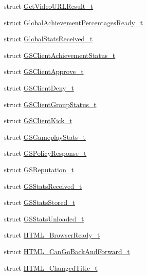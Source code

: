 \begin{DoxyCompactItemize}
\item 
struct \hyperlink{structValve_1_1Steamworks_1_1GetVideoURLResult__t}{Get\+Video\+U\+R\+L\+Result\+\_\+t}
\item 
struct \hyperlink{structValve_1_1Steamworks_1_1GlobalAchievementPercentagesReady__t}{Global\+Achievement\+Percentages\+Ready\+\_\+t}
\item 
struct \hyperlink{structValve_1_1Steamworks_1_1GlobalStatsReceived__t}{Global\+Stats\+Received\+\_\+t}
\item 
struct \hyperlink{structValve_1_1Steamworks_1_1GSClientAchievementStatus__t}{G\+S\+Client\+Achievement\+Status\+\_\+t}
\item 
struct \hyperlink{structValve_1_1Steamworks_1_1GSClientApprove__t}{G\+S\+Client\+Approve\+\_\+t}
\item 
struct \hyperlink{structValve_1_1Steamworks_1_1GSClientDeny__t}{G\+S\+Client\+Deny\+\_\+t}
\item 
struct \hyperlink{structValve_1_1Steamworks_1_1GSClientGroupStatus__t}{G\+S\+Client\+Group\+Status\+\_\+t}
\item 
struct \hyperlink{structValve_1_1Steamworks_1_1GSClientKick__t}{G\+S\+Client\+Kick\+\_\+t}
\item 
struct \hyperlink{structValve_1_1Steamworks_1_1GSGameplayStats__t}{G\+S\+Gameplay\+Stats\+\_\+t}
\item 
struct \hyperlink{structValve_1_1Steamworks_1_1GSPolicyResponse__t}{G\+S\+Policy\+Response\+\_\+t}
\item 
struct \hyperlink{structValve_1_1Steamworks_1_1GSReputation__t}{G\+S\+Reputation\+\_\+t}
\item 
struct \hyperlink{structValve_1_1Steamworks_1_1GSStatsReceived__t}{G\+S\+Stats\+Received\+\_\+t}
\item 
struct \hyperlink{structValve_1_1Steamworks_1_1GSStatsStored__t}{G\+S\+Stats\+Stored\+\_\+t}
\item 
struct \hyperlink{structValve_1_1Steamworks_1_1GSStatsUnloaded__t}{G\+S\+Stats\+Unloaded\+\_\+t}
\item 
struct \hyperlink{structValve_1_1Steamworks_1_1HTML__BrowserReady__t}{H\+T\+M\+L\+\_\+\+Browser\+Ready\+\_\+t}
\item 
struct \hyperlink{structValve_1_1Steamworks_1_1HTML__CanGoBackAndForward__t}{H\+T\+M\+L\+\_\+\+Can\+Go\+Back\+And\+Forward\+\_\+t}
\item 
struct \hyperlink{structValve_1_1Steamworks_1_1HTML__ChangedTitle__t}{H\+T\+M\+L\+\_\+\+Changed\+Title\+\_\+t}
\item 

\end{DoxyCompactItemize}
